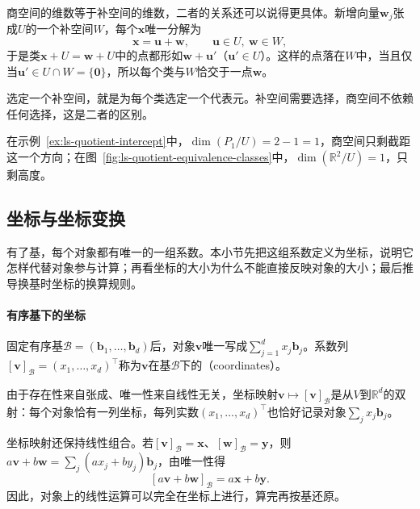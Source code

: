 商空间的维数等于补空间的维数，二者的关系还可以说得更具体。新增向量$\bm w_j$张成$U$的一个补空间$W$，每个$\bm x$唯一分解为
\[
 \bm x=\bm u+\bm w,\qquad \bm u\in U,\ \bm w\in W,
\]
于是类$\bm x+U=\bm w+U$中的点都形如$\bm w+\bm u'$（$\bm u'\in U$）。这样的点落在$W$中，当且仅当$\bm u'\in U\cap W=\{\bm0\}$，所以每个类与$W$恰交于一点$\bm w$。

选定一个补空间，就是为每个类选定一个代表元。补空间需要选择，商空间不依赖任何选择，这是二者的区别。

在示例~\ref{ex:ls-quotient-intercept}中，$\dim(P_1/U)=2-1=1$，商空间只剩截距这一个方向；在图~\ref{fig:ls-quotient-equivalence-classes}中，$\dim(\mathbb R^2/U)=1$，只剩高度。

\subsection{坐标与坐标变换}
\label{sec:ls-coordinates}
\label{sec:linear-algebra-coordinates}

有了基，每个对象都有唯一的一组系数。本小节先把这组系数定义为坐标，说明它怎样代替对象参与计算；再看坐标的大小为什么不能直接反映对象的大小；最后推导换基时坐标的换算规则。

\paragraph{有序基下的坐标}
固定有序基$\mathcal B=(\bm b_1,\ldots,\bm b_d)$后，对象$\bm v$唯一写成$\sum_{j=1}^d x_j\bm b_j$。系数列$[\bm v]_{\mathcal B}=(x_1,\ldots,x_d)^{\top}$称为$\bm v$在基$\mathcal B$下的（coordinates）。

由于存在性来自张成、唯一性来自线性无关，坐标映射$\bm v\mapsto[\bm v]_{\mathcal B}$是从$V$到$\mathbb R^d$的双射：每个对象恰有一列坐标，每列实数$(x_1,\ldots,x_d)^{\top}$也恰好记录对象$\sum_jx_j\bm b_j$。

坐标映射还保持线性组合。若$[\bm v]_{\mathcal B}=\bm x$、$[\bm w]_{\mathcal B}=\bm y$，则$a\bm v+b\bm w=\sum_j(ax_j+by_j)\bm b_j$，由唯一性得
\[
 [a\bm v+b\bm w]_{\mathcal B}=a\bm x+b\bm y.
\]
因此，对象上的线性运算可以完全在坐标上进行，算完再按基还原。

